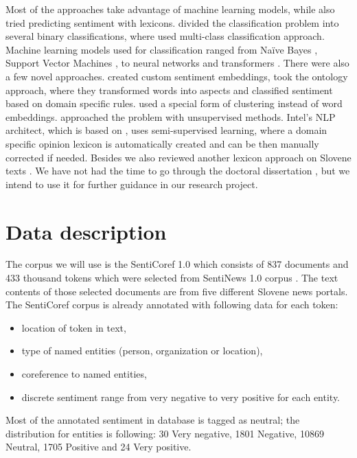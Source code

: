\documentclass[11pt,a4paper]{article}
\begin{document}
Most of the approaches take advantage of machine learning models, while \cite{sweeney} also tried predicting sentiment with lexicons. \cite{biyani} divided the classification problem into several binary classifications, where \cite{ding} used multi-class classification approach. Machine learning models used for classification ranged from Naïve Bayes \cite{c_sentinews}, Support Vector Machines \cite{tang}, to neural networks \cite{jebbara} and transformers \cite{yang}.
There were also a few novel approaches. \cite{jebbara} created custom sentiment embeddings, \cite{wallaart} took the ontology approach, where they transformed words into aspects and classified sentiment based on domain specific rules. \cite{guha} used a special form of clustering instead of word embeddings. \cite{hercig} approached the problem with unsupervised methods. Intel's NLP architect, which is based on \cite{mamou}, uses semi-supervised learning, where a domain specific opinion lexicon is automatically created and can be then manually corrected if needed.
Besides \cite{c_sentinews} we also reviewed another lexicon approach on Slovene texts \cite{kadunc}. We have not had the time to go through the doctoral dissertation \cite{bucar_phd}, but we intend to use it for further guidance in our research project.


\section{Data description}

The corpus we will use is the SentiCoref 1.0 \cite{c_senticoref} which consists of 837 documents and 433 thousand tokens which were selected from SentiNews 1.0 corpus \cite{c_sentinews}. The text contents of those selected documents are from five different Slovene news portals. The SentiCoref corpus is already annotated with following data for each token:

\begin{itemize}
    \item location of token in text,
    \item type of named entities (person, organization or location),
    \item coreference to named entities,
    \item discrete sentiment range from very negative to very positive for each entity. 
\end{itemize}

Most of the annotated sentiment in database is tagged as neutral; the distribution for entities is following: 30 Very negative, 1801 Negative, 10869 Neutral, 1705 Positive and 24 Very positive.
\end{document}
